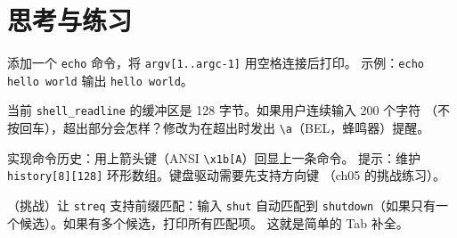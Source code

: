 \section{思考与练习}

\begin{exercise}
添加一个 \texttt{echo} 命令，将 \texttt{argv[1..argc-1]} 用空格连接后打印。
示例：\texttt{echo hello world} 输出 \texttt{hello world}。
\end{exercise}

\begin{exercise}
当前 \texttt{shell\_readline} 的缓冲区是 128 字节。如果用户连续输入 200 个字符
（不按回车），超出部分会怎样？修改为在超出时发出 \texttt{\textbackslash a}（BEL，蜂鸣器）提醒。
\end{exercise}

\begin{exercise}
实现命令历史：用上箭头键（ANSI \texttt{\textbackslash x1b[A}）回显上一条命令。
提示：维护 \texttt{history[8][128]} 环形数组。键盘驱动需要先支持方向键
（ch05 的挑战练习）。
\end{exercise}

\begin{exercise}
（挑战）让 \texttt{streq} 支持前缀匹配：输入 \texttt{shut} 自动匹配到
\texttt{shutdown}（如果只有一个候选）。如果有多个候选，打印所有匹配项。
这就是简单的 Tab 补全。
\end{exercise}


